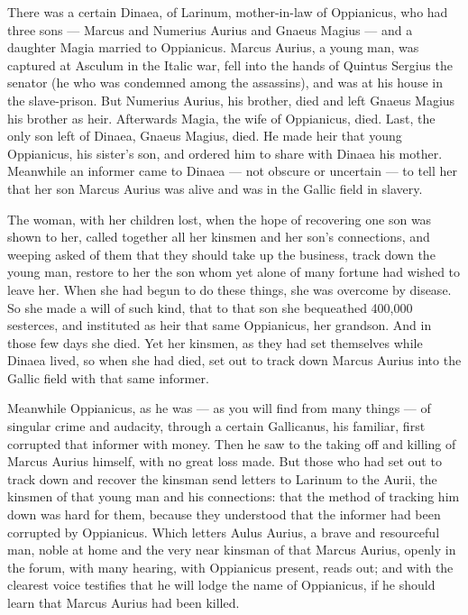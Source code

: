  There was a certain Dinaea, of Larinum, mother-in-law of Oppianicus, who had three sons --- Marcus and Numerius Aurius and Gnaeus Magius --- and a daughter Magia married to Oppianicus. Marcus Aurius, a young man, was captured at Asculum in the Italic war, fell into the hands of Quintus Sergius the senator (he who was condemned among the assassins), and was at his house in the slave-prison. But Numerius Aurius, his brother, died and left Gnaeus Magius his brother as heir. Afterwards Magia, the wife of Oppianicus, died. Last, the only son left of Dinaea, Gnaeus Magius, died. He made heir that young Oppianicus, his sister's son, and ordered him to share with Dinaea his mother. Meanwhile an informer came to Dinaea --- not obscure or uncertain --- to tell her that her son Marcus Aurius was alive and was in the Gallic field in slavery.

 The woman, with her children lost, when the hope of recovering one son was shown to her, called together all her kinsmen and her son's connections, and weeping asked of them that they should take up the business, track down the young man, restore to her the son whom yet alone of many fortune had wished to leave her. When she had begun to do these things, she was overcome by disease. So she made a will of such kind, that to that son she bequeathed 400,000 sesterces, and instituted as heir that same Oppianicus, her grandson. And in those few days she died. Yet her kinsmen, as they had set themselves while Dinaea lived, so when she had died, set out to track down Marcus Aurius into the Gallic field with that same informer.

 Meanwhile Oppianicus, as he was --- as you will find from many things --- of singular crime and audacity, through a certain Gallicanus, his familiar, first corrupted that informer with money. Then he saw to the taking off and killing of Marcus Aurius himself, with no great loss made. But those who had set out to track down and recover the kinsman send letters to Larinum to the Aurii, the kinsmen of that young man and his connections: that the method of tracking him down was hard for them, because they understood that the informer had been corrupted by Oppianicus. Which letters Aulus Aurius, a brave and resourceful man, noble at home and the very near kinsman of that Marcus Aurius, openly in the forum, with many hearing, with Oppianicus present, reads out; and with the clearest voice testifies that he will lodge the name of Oppianicus, if he should learn that Marcus Aurius had been killed.

